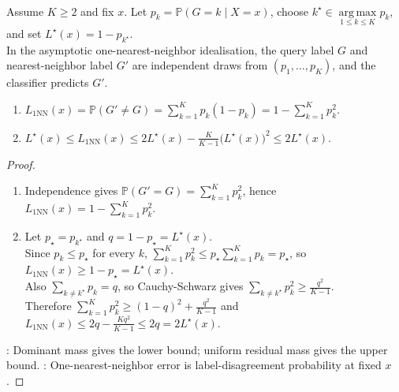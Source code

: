 \begin{proposition} \label{prop:sl-cover-hart-nearest-neighbor-bound} \\
Assume $K\geq2$ and fix $x$. Let $p_k=\mathbb{P}(G=k\mid X=x)$, choose $k^\star\in\operatorname*{arg\,max}\limits_{1\leq k\leq K}p_k$, and set $L^\star(x)=1-p_{k^\star}$.\\
In the asymptotic one-nearest-neighbor idealisation, the query label $G$ and nearest-neighbor label $G'$ are independent draws from $(p_1,\ldots,p_K)$, and the classifier predicts $G'$.
\begin{enumerate}[label=(\roman*)]
\setlength{\itemsep}{0pt}
\item $L_{1\mathrm{NN}}(x)=\mathbb{P}(G'\neq G)=\sum\limits_{k=1}^K p_k(1-p_k)=1-\sum\limits_{k=1}^K p_k^2$.
\item $L^\star(x)\leq L_{1\mathrm{NN}}(x)\leq 2L^\star(x)-\frac{K}{K-1}\bigl(L^\star(x)\bigr)^2\leq 2L^\star(x)$.
\end{enumerate}
\begin{proof}
\begin{enumerate}[label=(\roman*)]
\setlength{\itemsep}{0pt}
\item Independence gives $\mathbb{P}(G'=G)=\sum\limits_{k=1}^Kp_k^2$, hence $L_{1\mathrm{NN}}(x)=1-\sum\limits_{k=1}^Kp_k^2$.
\item Let $p_\star=p_{k^\star}$ and $q=1-p_\star=L^\star(x)$.\\
Since $p_k\leq p_\star$ for every $k$, $\sum\limits_{k=1}^Kp_k^2\leq p_\star\sum\limits_{k=1}^Kp_k=p_\star$, so $L_{1\mathrm{NN}}(x)\geq1-p_\star=L^\star(x)$.\\
Also $\sum\limits_{k\neq k^\star}p_k=q$, so Cauchy-Schwarz gives $\sum\limits_{k\neq k^\star}p_k^2\geq\frac{q^2}{K-1}$.\\
Therefore $\sum\limits_{k=1}^Kp_k^2\geq(1-q)^2+\frac{q^2}{K-1}$ and $L_{1\mathrm{NN}}(x)\leq2q-\frac{Kq^2}{K-1}\leq2q=2L^\star(x)$.
\end{enumerate}
: Dominant mass gives the lower bound; uniform residual mass gives the upper bound.
: One-nearest-neighbor error is label-disagreement probability at fixed $x$.
\end{proof}
\end{proposition}


